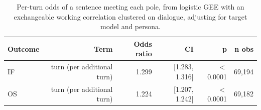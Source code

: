 \begin{table}[t]
\centering
\small
\caption{Per-turn odds of a sentence meeting each pole, from logistic GEE with an exchangeable working correlation clustered on dialogue, adjusting for target model and persona.}
\label{tab:gee_turn}
\begin{tabular}{lrrrrr}
\toprule
Outcome & Term & Odds ratio & CI & p & n obs \\
\midrule
IF & turn (per additional turn) & 1.299 & [1.283, 1.316] & $<$0.0001 & 69,194 \\
OS & turn (per additional turn) & 1.224 & [1.207, 1.242] & $<$0.0001 & 69,182 \\
\bottomrule
\end{tabular}
\end{table}
